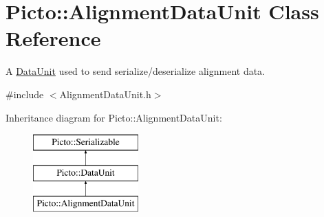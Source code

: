 \hypertarget{class_picto_1_1_alignment_data_unit}{\section{Picto\-:\-:Alignment\-Data\-Unit Class Reference}
\label{class_picto_1_1_alignment_data_unit}
}


A \hyperlink{class_picto_1_1_data_unit}{Data\-Unit} used to send serialize/deserialize alignment data.  




{\ttfamily \#include $<$Alignment\-Data\-Unit.\-h$>$}

Inheritance diagram for Picto\-:\-:Alignment\-Data\-Unit\-:\begin{figure}[H]
\begin{center}
\leavevmode
\includegraphics[height=3.000000cm]{class_picto_1_1_alignment_data_unit}
\end{center}
\end{figure}
